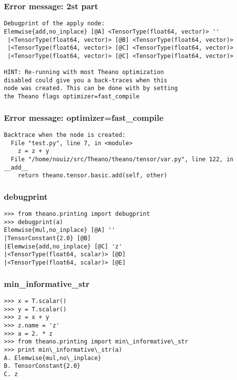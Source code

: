 \documentclass[utf8x,xcolor=pdftex,dvipsnames,table]{beamer}
\begin{document}
\begin{frame}[fragile]
  \frametitle{Error message: 2st part}

\begin{lstlisting}
Debugprint of the apply node:
Elemwise{add,no_inplace} [@A] <TensorType(float64, vector)> ''
 |<TensorType(float64, vector)> [@B] <TensorType(float64, vector)>
 |<TensorType(float64, vector)> [@C] <TensorType(float64, vector)>
 |<TensorType(float64, vector)> [@C] <TensorType(float64, vector)>

HINT: Re-running with most Theano optimization
disabled could give you a back-traces when this
node was created. This can be done with by setting
the Theano flags optimizer=fast_compile
\end{lstlisting}
\end{frame}

\begin{frame}[fragile]
  \frametitle{Error message: optimizer=fast\_compile}

\begin{lstlisting}
Backtrace when the node is created:
  File "test.py", line 7, in <module>
    z = z + y
  File "/home/nouiz/src/Theano/theano/tensor/var.py", line 122, in __add__
    return theano.tensor.basic.add(self, other)

\end{lstlisting}
\end{frame}

\begin{frame}[fragile]
  \frametitle{debugprint}

\begin{lstlisting}
>>> from theano.printing import debugprint
>>> debugprint(a)
Elemwise{mul,no_inplace} [@A] ''
|TensorConstant{2.0} [@B]
|Elemwise{add,no_inplace} [@C] 'z'
|<TensorType(float64, scalar)> [@D]
|<TensorType(float64, scalar)> [@E]
\end{lstlisting}
\end{frame}

\begin{frame}[fragile]
  \frametitle{min\_informative\_str}

\begin{lstlisting}
>>> x = T.scalar()
>>> y = T.scalar()
>>> z = x + y
>>> z.name = 'z'
>>> a = 2. * z
>>> from theano.printing import min\_informative\_str
>>> print min\_informative\_str(a)
A. Elemwise{mul,no\_inplace}
B. TensorConstant{2.0}
C. z
\end{lstlisting}
\end{frame}
\end{document}
